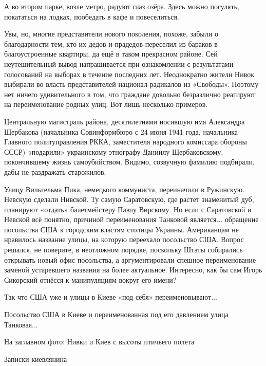 
А во втором парке, возле метро, радуют глаз озёра. Здесь можно погулять,
покататься на лодках, пообедать в кафе и повеселиться.


Увы, но, многие представители нового поколения, похоже, забыли о благодарности
тем, кто их дедов и прадедов переселил из бараков в благоустроенные квартиры,
да ещё в таком прекрасном районе. Сей неутешительный вывод напрашивается при
ознакомлении с результатами голосований на выборах в течение последних лет.
Неоднократно жители Нивок выбирали во власть представителей национал-радикалов
из «Свободы». Поэтому нет ничего удивительного в том, что граждане довольно
безразлично реагируют на переименование родных улиц. Вот лишь несколько
примеров.

Центральную магистраль района, десятилетиями носившую имя Александра Щербакова
(начальника Совинформбюро с 24 июня 1941 года, начальника Главного
политуправления РККА, заместителя народного комиссара обороны СССР) «подарили»
украинскому этнографу Даниилу Щербаковскому, покончившему жизнь самоубийством.
Видимо, созвучную фамилию подбирали, дабы не раздражать старожилов.


Улицу Вильгельма Пика, немецкого коммуниста, переиначили в Ружинскую. Невскую
сделали Нивской. Ту самую Саратовскую, где растет знаменитый дуб, планируют
«отдать» балетмейстеру Павлу Вирскому.  Но если с Саратовской и Невской всё
понятно, причиной переименования Танковой является... обращение посольства США к
городским властям столицы Украины. Американцам не нравилось название улицы, на
которую переехало посольство США. Вопрос решался, не поверите, в неотложном
порядке, поскольку Штаты собирались открывать новый офис посольства, а
аргументировали спешное переименование заменой устаревшего названия на более
актуальное. Интересно, как бы сам Игорь Сикорский отнёсся к манипуляциям вокруг
его имени?

Так что США уже и улицы в Киеве «под себя» переименовывают...


Посольство США в Киеве и переименованная под его давлением улица Танковая...

На заглавном фото: Нивки и Киев с высоты птичьего полета

Записки киевлянина
